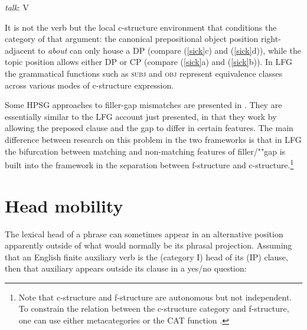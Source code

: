 \eal \label{talk-about}
{{\it talk}\/: V}\qquad{}    
\zl

\noindent
It is not the verb but the local c-structure environment that conditions the category of that argument: the canonical prepositional object position right-adjacent to \textit{about} can only house a DP (compare (\ref{sick}c) and (\ref{sick}d)), while the topic position allows either DP or CP (compare (\ref{sick}a) and (\ref{sick}b)).  In LFG the grammatical functions such as \textsc{subj} and \textsc{obj} represent equivalence classes across various modes of c-structure expression.  

Some HPSG approaches to filler-gap mismatches are presented in .  They are essentially similar to the LFG account just presented, in that they work by allowing the preposed clause and the gap to differ in certain features.  The main difference between research on this problem in the two frameworks is that in LFG the bifurcation between matching and non-matching features of filler/""gap  is built into the framework in the separation between f-structure and c-structure.\footnote{Note that c-structure and f-structure are autonomous but not independent.  To constrain the relation between the c-structure category and f-structure, one can use either metacategories \citep[691-698]{dalrymple;ea19} or the CAT function \citep[265]{dalrymple;ea19}.}  



\section{Head mobility} 
\label{mobile-sec}
The lexical head of a phrase can sometimes appear in an alternative position apparently outside of what would normally be its phrasal projection.  Assuming that an English finite auxiliary verb is the (category I) head of its (IP) clause, then that auxiliary appears outside its clause in a yes/no question:

